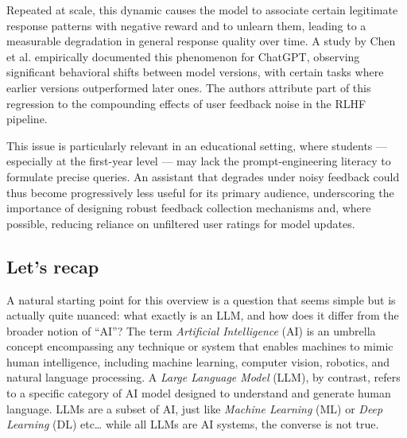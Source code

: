 \documentclass[a4paper,11pt]{article}
\begin{document}
Repeated at scale, this dynamic causes the model to associate certain
legitimate response patterns with negative reward and to unlearn them,
leading to a measurable degradation in general response quality over time.
A study by Chen et al. \cite{chen2023chatgpt} empirically documented this
phenomenon for ChatGPT, observing significant behavioral shifts between
model versions, with certain tasks where earlier versions outperformed later
ones. The authors attribute part of this regression to the compounding
effects of user feedback noise in the RLHF pipeline.

This issue is particularly relevant in an educational setting, where students
--- especially at the first-year level --- may lack the prompt-engineering
literacy to formulate precise queries. An assistant that degrades under
noisy feedback could thus become progressively less useful for its primary
audience, underscoring the importance of designing robust feedback collection
mechanisms and, where possible, reducing reliance on unfiltered user ratings
for model updates.
\subsection{Let's recap}
A natural starting point for this overview is a question that seems simple
but is actually quite nuanced: what exactly is an LLM, and how does it
differ from the broader notion of ``AI''? The term \emph{Artificial
Intelligence} (AI) is an umbrella concept encompassing any technique or
system that enables machines to mimic human intelligence, including machine
learning, computer vision, robotics, and natural language processing. A
\emph{Large Language Model} (LLM), by contrast, refers to a specific
category of AI model designed to understand and generate human language.
LLMs are a subset of AI, just like \emph{Machine Learning } (ML) or \emph{Deep Learning} (DL) etc\dots
while all LLMs are AI systems, the converse is not true.
 
\end{document}
